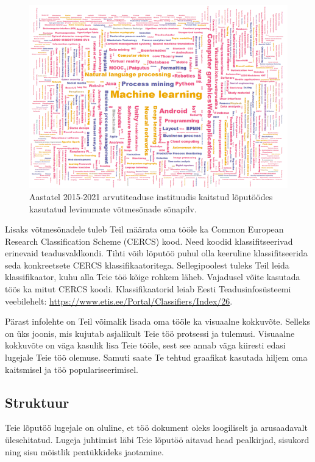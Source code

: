 \begin{figure}[ht]
    \centering
    \includegraphics[width=\textwidth]{figures/Joonis1-Võtmesõnad.png}
    \caption{Aastatel 2015-2021 arvutiteaduse instituudis kaitstud lõputöödes kasutatud levinumate võtmesõnade sõnapilv.}
    \label{fig:võtmesõnad}
\end{figure}

Lisaks võtmesõnadele tuleb Teil määrata oma tööle ka Common European Research Classification Scheme (CERCS) kood. Need koodid klassifitseerivad erinevaid teadusvaldkondi. Tihti võib lõputöö puhul olla keeruline klassifitseerida seda konkreetsete CERCS klassifikaatoritega. Sellegipoolest tuleks Teil leida klassifikaator, kuhu alla Teie töö kõige rohkem läheb. Vajadusel võite kasutada töös ka mitut CERCS koodi. Klassifikaatorid leiab Eesti Teadusinfosüsteemi veebilehelt: \url{https://www.etis.ee/Portal/Classifiers/Index/26}.

Pärast infolehte on Teil võimalik lisada oma tööle ka visuaalne kokkuvõte. Selleks on üks joonis, mis kujutab asjalikult Teie töö protsessi ja tulemusi. Visuaalne kokkuvõte on väga kasulik lisa Teie tööle, sest see annab väga kiiresti edasi lugejale Teie töö olemuse. Samuti saate Te tehtud graafikat kasutada hiljem oma kaitsmisel ja töö populariseerimisel.

\subsection{Struktuur}
Teie lõputöö lugejale on oluline, et töö dokument oleks loogiliselt ja arusaadavalt ülesehitatud. Lugeja juhtimist läbi Teie lõputöö aitavad head pealkirjad, sisukord ning sisu mõistlik peatükkideks jaotamine.

